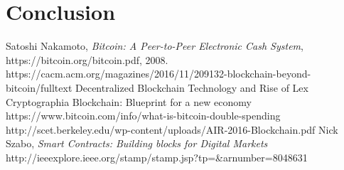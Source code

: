 \documentclass[report]{IEEEtran}
\begin{document}
\section{Conclusion}

\begin{thebibliography}{1}

Satoshi Nakamoto, \emph{Bitcoin: A Peer-to-Peer Electronic Cash System}, https://bitcoin.org/bitcoin.pdf, 2008.
https://cacm.acm.org/magazines/2016/11/209132-blockchain-beyond-bitcoin/fulltext
Decentralized Blockchain Technology and Rise of Lex Cryptographia
Blockchain: Blueprint for a new economy
https://www.bitcoin.com/info/what-is-bitcoin-double-spending
http://scet.berkeley.edu/wp-content/uploads/AIR-2016-Blockchain.pdf
Nick Szabo, \emph{Smart Contracts: Building blocks for Digital Markets}
http://ieeexplore.ieee.org/stamp/stamp.jsp?tp=&arnumber=8048631
\end{thebibliography}
\end{document}
